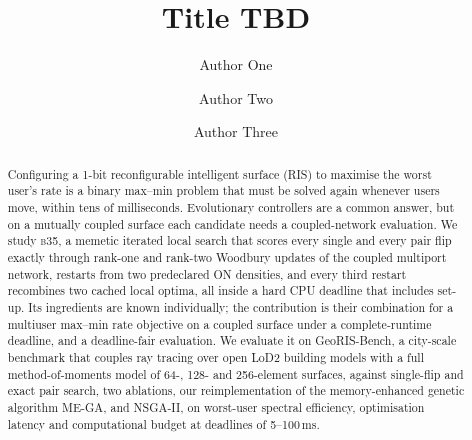 \documentclass[runningheads]{llncs}
\newcommand{\bts}{\textsc{b35}}
\begin{document}
\title{Title TBD}
\author{Author One \and
Author Two \and
Author Three}
\maketitle

\begin{abstract}
Configuring a 1-bit reconfigurable intelligent surface (RIS) to maximise the worst user's rate is a binary max--min problem that must be solved again whenever users move, within tens of milliseconds. Evolutionary controllers are a common answer, but on a mutually coupled surface each candidate needs a coupled-network evaluation. We study \bts{}, a memetic iterated local search that scores every single and every pair flip exactly through rank-one and rank-two Woodbury updates of the coupled multiport network, restarts from two predeclared ON densities, and every third restart recombines two cached local optima, all inside a hard CPU deadline that includes set-up. Its ingredients are known individually; the contribution is their combination for a multiuser max--min rate objective on a coupled surface under a complete-runtime deadline, and a deadline-fair evaluation. We evaluate it on GeoRIS-Bench, a city-scale benchmark that couples ray tracing over open LoD2 building models with a full method-of-moments model of 64-, 128- and 256-element surfaces, against single-flip and exact pair search, two ablations, our reimplementation of the memory-enhanced genetic algorithm ME-GA, and NSGA-II, on worst-user spectral efficiency, optimisation latency and computational budget at deadlines of 5--100\,ms.
\end{abstract}

\end{document}
